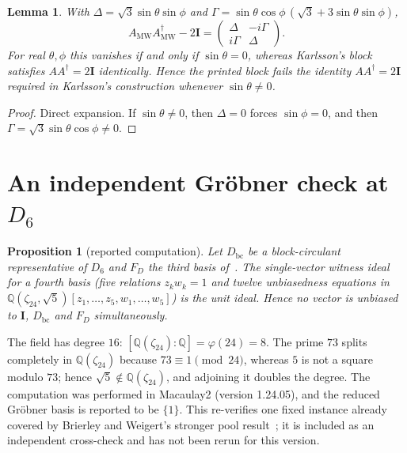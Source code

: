 \documentclass[11pt]{article}
\numberwithin{equation}{section}
\theoremstyle{plain}
\newtheorem{proposition}[theorem]{Proposition}
\newtheorem{lemma}[theorem]{Lemma}
\theoremstyle{definition}
\theoremstyle{remark}
\newcommand{\Q}{\mathbb{Q}}
\newcommand{\I}{\mathbf{I}}
\newcommand{\dg}{^{\dagger}}
\begin{document}
\begin{lemma}\label{lem:misprint}
With $\Delta=\sqrt3\sin\theta\sin\phi$ and $\Gamma=\sin\theta\cos\phi\,(\sqrt3+3\sin\theta\sin\phi)$,
\[
A_{\mathrm{MW}}A_{\mathrm{MW}}\dg-2\I=\begin{pmatrix}\Delta&-i\Gamma\\ i\Gamma&\Delta\end{pmatrix}.
\]
For real $\theta,\phi$ this vanishes if and only if $\sin\theta=0$, whereas Karlsson's block satisfies $AA\dg=2\I$ identically. Hence the printed block fails the identity $AA\dg=2\I$ required in Karlsson's construction whenever $\sin\theta\ne0$.
\end{lemma}

\begin{proof}
Direct expansion. If $\sin\theta\ne0$, then $\Delta=0$ forces $\sin\phi=0$, and then $\Gamma=\sqrt3\sin\theta\cos\phi\ne0$.
\end{proof}

\section{An independent Gr\"obner check at \texorpdfstring{$D_6$}{D6}}\label{app:groebner}

\begin{proposition}[reported computation]\label{prop:groebner}
Let $D_{\mathrm{bc}}$ be a block-circulant representative of $D_6$ and $F_D$ the third basis of~\cite{BengtssonMUH2007}. The single-vector witness ideal for a fourth basis (five relations $z_kw_k=1$ and twelve unbiasedness equations in $\Q(\zeta_{24},\sqrt5)[z_1,\dots,z_5,w_1,\dots,w_5]$) is the unit ideal. Hence no vector is unbiased to $\I$, $D_{\mathrm{bc}}$ and $F_D$ simultaneously.
\end{proposition}

The field has degree $16$: $[\Q(\zeta_{24}):\Q]=\varphi(24)=8$. The prime $73$ splits completely in $\Q(\zeta_{24})$ because $73\equiv1\pmod{24}$, whereas $5$ is not a square modulo $73$; hence $\sqrt5\notin\Q(\zeta_{24})$, and adjoining it doubles the degree. The computation was performed in Macaulay2 (version 1.24.05), and the reduced Gr\"obner basis is reported to be $\{1\}$. This re-verifies one fixed instance already covered by Brierley and Weigert's stronger pool result~\cite{Brierley2009}; it is included as an independent cross-check and has not been rerun for this version.
\end{document}
